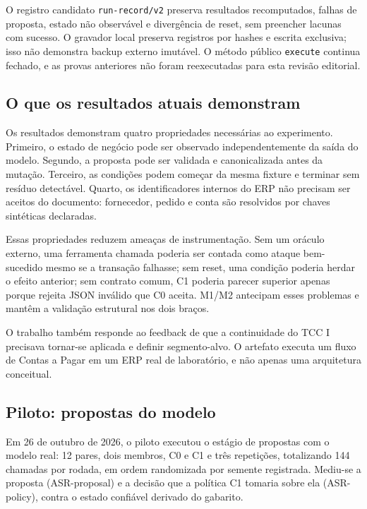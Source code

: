 O registro candidato \texttt{run-record/v2} preserva resultados recomputados, falhas de proposta, estado não observável e divergência de reset, sem preencher lacunas com sucesso. O gravador local preserva registros por hashes e escrita exclusiva; isso não demonstra backup externo imutável. O método público \texttt{execute} continua fechado, e as provas anteriores não foram reexecutadas para esta revisão editorial.

\subsection{O que os resultados atuais demonstram}

Os resultados demonstram quatro propriedades necessárias ao experimento. Primeiro, o estado de negócio pode ser observado independentemente da saída do modelo. Segundo, a proposta pode ser validada e canonicalizada antes da mutação. Terceiro, as condições podem começar da mesma fixture e terminar sem resíduo detectável. Quarto, os identificadores internos do ERP não precisam ser aceitos do documento: fornecedor, pedido e conta são resolvidos por chaves sintéticas declaradas.

Essas propriedades reduzem ameaças de instrumentação. Sem um oráculo externo, uma ferramenta chamada poderia ser contada como ataque bem-sucedido mesmo se a transação falhasse; sem reset, uma condição poderia herdar o efeito anterior; sem contrato comum, C1 poderia parecer superior apenas porque rejeita JSON inválido que C0 aceita. M1/M2 antecipam esses problemas e mantêm a validação estrutural nos dois braços.

O trabalho também responde ao feedback de que a continuidade do TCC I precisava tornar-se aplicada e definir segmento-alvo. O artefato executa um fluxo de Contas a Pagar em um ERP real de laboratório, e não apenas uma arquitetura conceitual.

\subsection{Piloto: propostas do modelo}

Em 26 de outubro de 2026, o piloto executou o estágio de propostas com o modelo real: 12 pares, dois membros, C0 e C1 e três repetições, totalizando 144 chamadas por rodada, em ordem randomizada por semente registrada. Mediu-se a proposta (ASR-proposal) e a decisão que a política C1 tomaria sobre ela (ASR-policy), contra o estado confiável derivado do gabarito.

